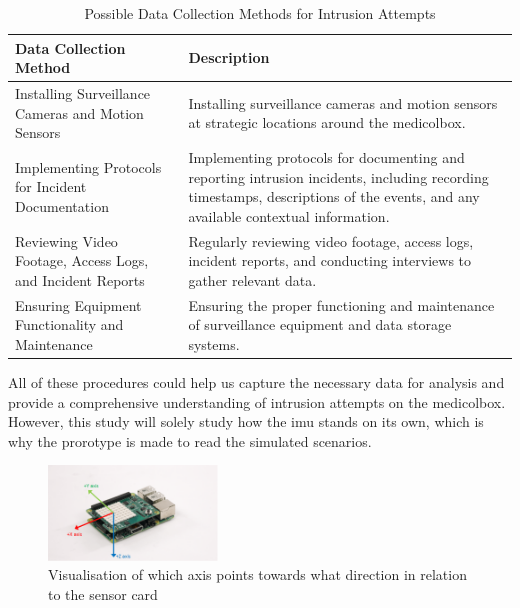 \documentclass[../main.tex]{subfiles}
\begin{document}
    \begin{table}[htbp]
        \centering
        \caption{Possible Data Collection Methods for Intrusion Attempts}
        \label{tab:DataCollectionMethods}
        \begin{tabular}{|l|p{10cm}|} \hline
            \textbf{Data Collection Method} & \textbf{Description} \\ \hline
            Installing Surveillance Cameras and Motion Sensors &
            Installing surveillance cameras and motion sensors at strategic locations around the \gls{medicolbox}. \\ \hline
            
            Implementing Protocols for Incident Documentation &
            Implementing protocols for documenting and reporting \gls{intrusion} incidents, including recording timestamps, descriptions of the events, and any available contextual information. \\ \hline
            
            Reviewing Video Footage, Access Logs, and Incident Reports &
            Regularly reviewing video footage, access logs, incident reports, and conducting interviews to gather relevant data. \\ \hline
            
            Ensuring Equipment Functionality and Maintenance &
            Ensuring the proper functioning and maintenance of surveillance equipment and data storage systems. \\ \hline
        \end{tabular}
    \end{table}
    
    All of these procedures could help us capture the necessary data for analysis and provide a
    comprehensive understanding of \gls{intrusion} attempts on the \gls{medicolbox}. However, this study will solely study how the \gls{imu} stands on its own, which is why the prorotype is made to read the simulated scenarios.

    \begin{figure}[htbp]
        \centering
        \includegraphics[width=0.4\textwidth]{resources/images/xxsensehat_axisinfo.png}
        \caption{Visualisation of which axis points towards what direction in relation to the sensor card}
        \label{fig:xxsensehat_axisinfo}
    \end{figure}
\end{document}
